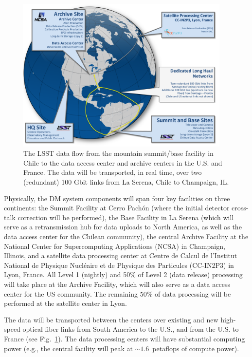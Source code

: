 \documentclass[11pt,twoside]{article}
\begin{document}
\begin{figure}[!t]
%
%
\begin{center}
\includegraphics[width=0.95\textwidth,clip]{DMX2.pdf}
\end{center}
\caption{The LSST data flow from the mountain summit/base facility in
Chile to the data access center and archive centers in the U.S. and France.
The data will be transported, in real time, over two (redundant) 
100 Gbit links from La Serena, Chile to Champaign, IL.
}
\label{Fig:DM2}
\end{figure}

Physically, the DM system components will span four key facilities on three
continents: the Summit Facility at  Cerro Pach\'on (where the initial
detector cross-talk
correction will be performed), the Base Facility in La Serena (which will serve
as a retransmission hub for data
uploads to North America, as well as the data access center for the Chilean
community), the central Archive Facility at the National Center
for Supercomputing Applications (NCSA) in Champaign, Illinois, and a
satellite data processing center at Centre de Calcul de l'Institut National
de Physique Nucl\'{e}aire et de Physique des Particules (CC-IN2P3) in Lyon, France.
All Level 1 (nightly) and 50\% of Level 2 (data release) processing will take place at the
Archive Facility, which will also serve as a data access center
for the US community. The remaining 50\% of data processing will be performed at
the satellite center in Lyon.

The data will be transported between the centers over existing and new high-speed optical fiber
links from South America to the U.S., and from the U.S. to France (see Fig.~\ref{Fig:DM2}).
The data processing centers will have substantial computing
power (e.g., the central facility will peak at $\sim 1.6$~petaflops of
compute power).
\\
\end{document}

